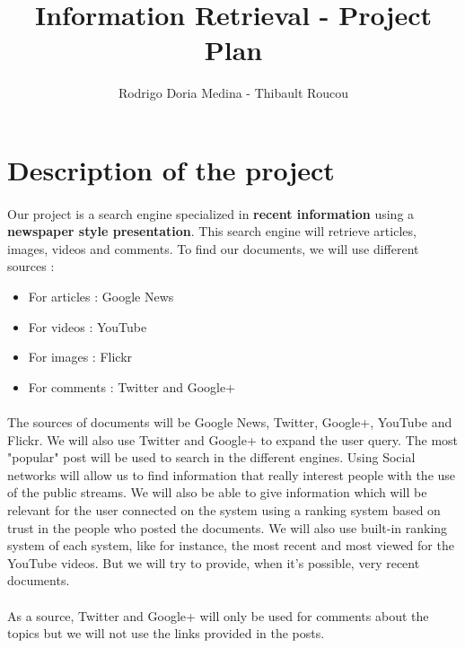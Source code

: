 \documentclass[english,7pt]{article}
\title{Information Retrieval - Project Plan}
\author{Rodrigo Doria Medina - Thibault Roucou }
\begin{document}
\maketitle


\section{Description of the project}

\paragraph{}Our project is a search engine specialized in \textbf{recent information} using a \textbf{newspaper style presentation}. This search engine will retrieve articles, images, videos and comments. To find our documents, we will use different sources : 

\begin{itemize}
    \item For articles : Google News
    \item For videos : YouTube
    \item For images : Flickr
    \item For comments : Twitter and Google+
\end{itemize}


\paragraph{}The sources of documents will be Google News, Twitter, Google+, YouTube and Flickr. We will also use Twitter and Google+ to expand the user query. The most "popular" post will be used to search in the different engines. Using Social networks will allow us to find information that really interest people with the use of the public streams. We will also be able to give information which will be relevant for the user connected on the system using a ranking system based on trust in the people who posted the documents. We will also use built-in ranking system of each system, like for instance, the most recent and most viewed for the YouTube videos. But we will try to provide, when it's possible, very recent documents.

\paragraph{}As a source, Twitter and Google+ will only be used for comments about the topics but we will not use the links provided in the posts.
\end{document}
